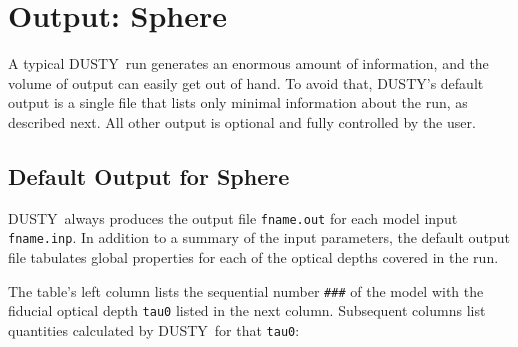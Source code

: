 \documentclass[11pt]{article}
\def\D    {{\sf DUSTY}}
\begin{document}
\section{Output: Sphere}
\label{sec:output_sph}

A typical \D\ run generates an enormous amount of information, and the
volume of output can easily get out of hand. To avoid that, \D's
default output is a single file that lists only minimal information
about the run, as described next. All other output is optional and
fully controlled by the user.

\subsection{Default Output for Sphere}
\label{sec:default_sph}

\D\ always produces the output file {\tt fname.out} for each model
input {\tt fname.inp}. In addition to a summary of the input
parameters, the default output file tabulates global properties for
each of the optical depths covered in the run.

The table's left column lists the sequential number {\tt \#\#\#} of
the model with the fiducial optical depth {\tt tau0} listed in the
next column.  Subsequent columns list quantities calculated by \D\ for
that {\tt tau0}:
\end{document}
